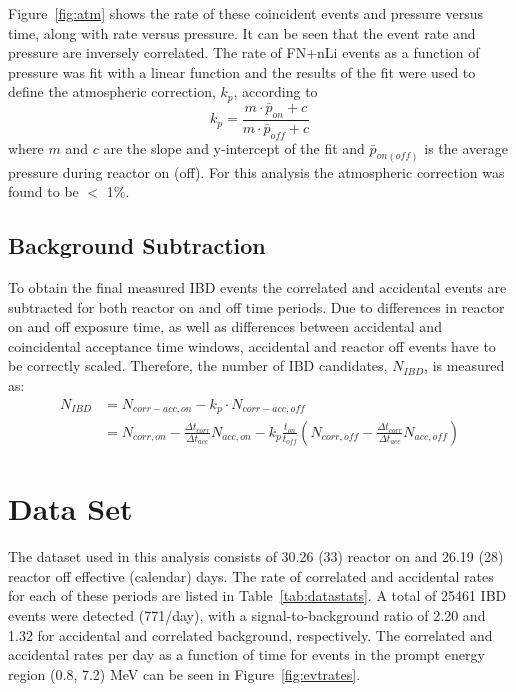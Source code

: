 Figure~\ref{fig:atm} shows the rate of these coincident events and pressure versus time, along with rate versus pressure.
It can be seen that the event rate and pressure are inversely correlated. 
The rate of FN+nLi events as a function of pressure was fit with a linear function and the results of the fit were used to define the atmospheric correction, $k_p$, according to
\begin{equation}
k_p = \frac{m \cdot \bar{p}_{on} + c}{m \cdot \bar{p}_{off} + c}
\end{equation}
where $m$ and $c$ are the slope and y-intercept of the fit and $\bar{p}_{on (off)}$ is the average pressure during reactor on (off).
For this analysis the atmospheric correction was found to be $<$ 1\%.


\subsection{Background Subtraction}

To obtain the final measured IBD events the correlated and accidental events are subtracted for both reactor on and off time periods.
Due to differences in reactor on and off exposure time, as well as differences between accidental and coincidental acceptance time windows, accidental and reactor off events have to be correctly scaled.
Therefore, the number of IBD candidates, $N_{IBD}$, is measured as:
\begin{equation}
\begin{split}
	N_{IBD} &= N_{corr-acc, on} - k_p \cdot N_{corr-acc, off} \\
				 &= N_{corr, on} - \frac{\Delta t_{corr}}{\Delta t_{acc}} N_{acc, on} - k_p \frac{t_{on}}{t_{off}}\left(N_{corr, off} - \frac{\Delta t_{corr}}{\Delta t_{acc}}N_{acc,off}\right)
\end{split}
\end{equation}


\section{Data Set}

The dataset used in this analysis consists of 30.26 (33) reactor on and 26.19 (28) reactor off effective (calendar) days.
The rate of correlated and accidental rates for each of these periods are listed in Table~\ref{tab:datastats}.
A total of 25461 IBD events were detected (771/day), with a signal-to-background ratio of 2.20 and 1.32 for accidental and correlated background, respectively.
The correlated and accidental rates per day as a function of time for events in the prompt energy region (0.8, 7.2) MeV can be seen in Figure~\ref{fig:evtrates}.

